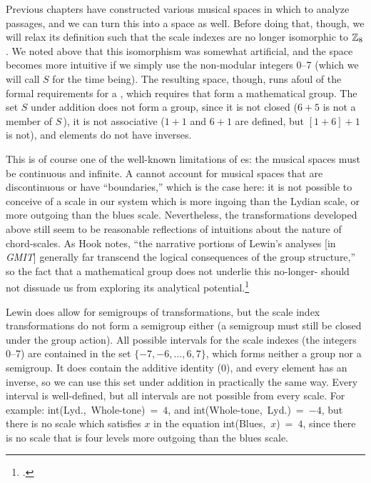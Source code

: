 Previous chapters have constructed various musical spaces in which to analyze
passages, and we can turn this \gis into a space as well. Before doing that,
though, we will relax its definition such that the scale indexes are no longer
isomorphic to $\mathbb{Z}_8$. We noted above that this isomorphism was somewhat
artificial, and the space becomes more intuitive if we simply use the
non-modular integers 0--7 (which we will call $S$ for the time being). The
resulting space, though, runs afoul of the formal requirements for a \gis,
which requires that \ivls form a mathematical group. The set $S$ under
addition does not form a group, since it is not closed ($6+5$
is not a member of $S$\,), it is not associative ($1+1$ and $6+1$ are defined,
but $[1 + 6] + 1$ is not), and elements do not have inverses.

This is of course one of the well-known limitations of \gis{}es: the musical
spaces must be continuous and infinite. A \gis cannot account for
musical spaces that are discontinuous or have ``boundaries,'' which is the
case here: it is not possible to conceive of a scale in our system which is
more ingoing than the Lydian scale, or more outgoing than the blues
scale. Nevertheless, the transformations developed above still seem
to be reasonable reflections of intuitions about the nature of chord-scales.
As Hook notes, ``the narrative portions of Lewin's analyses [in \emph{GMIT}]
generally far transcend the logical consequences of the group structure,'' so
the fact that a mathematical group does not underlie this no-longer-\gis
should not dissuade us from exploring its analytical
potential.\footcite[185]{hook:2007gmit}

Lewin does allow for semigroups of transformations, but the scale index
transformations do not form a semigroup either (a semigroup must still be
closed under the group action). All possible intervals for the scale indexes
(the integers 0--7) are contained in the set $\{-7, -6, \ldots, 6, 7\}$, which
forms neither a group nor a semigroup. It does contain the additive identity
($0$), and every element has an inverse, so we can use this set under addition
in practically the same way. Every interval is well-defined, but all intervals
are not possible from every scale. For example: \mbox{int(Lyd., Whole-tone) =
  $4$}, and \mbox{int(Whole-tone, Lyd.) = $-4$}, but there is no scale which
satisfies $x$ in the equation \mbox{int(Blues, $x$) = $4$}, since there is no
scale that is four levels more outgoing than the blues scale.

